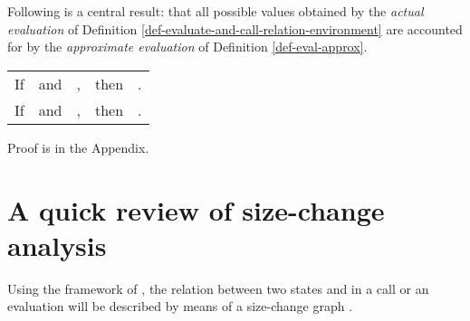 \documentclass{LMCS}
\newcommand{\fl}{\noindent}
\newcommand{\bt}{\begin{tabular}}
\newcommand{\et}{\end{tabular}}
\newcommand{\blem}{\begin{lem}}
\newcommand{\elem}{\end{lem}}
\theoremstyle{definition}\newtheorem{env}[thm]{Environment}
\begin{document}
Following is a central result: that 
all possible values obtained by the {\em actual evaluation} of  Definition \ref{def-evaluate-and-call-relation-environment}
are accounted for by
the {\em approximate evaluation} of Definition \ref{def-eval-approx}.
\blem \label{abs-super} 
\hfill  \bt{ccccc} If  &and& , &then& 
. \\

\hfill  If    &and& , &then& .
\et
\elem
\fl Proof is in the Appendix.
\section{A quick review of size-change analysis}
 \label{sec-quick-review-size-change-analysis}


Using the framework of  \cite{popl01}, the relation between two
states  and  in a call 
 or an evaluation  will be
described by means of a size-change graph . 
\end{document}
